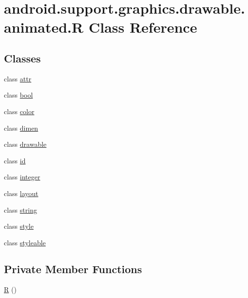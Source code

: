 \hypertarget{classandroid_1_1support_1_1graphics_1_1drawable_1_1animated_1_1_r}{}\section{android.\+support.\+graphics.\+drawable.\+animated.\+R Class Reference}
\label{classandroid_1_1support_1_1graphics_1_1drawable_1_1animated_1_1_r}
\subsection*{Classes}
\begin{DoxyCompactItemize}
\item 
class \mbox{\hyperlink{classandroid_1_1support_1_1graphics_1_1drawable_1_1animated_1_1_r_1_1attr}{attr}}
\item 
class \mbox{\hyperlink{classandroid_1_1support_1_1graphics_1_1drawable_1_1animated_1_1_r_1_1bool}{bool}}
\item 
class \mbox{\hyperlink{classandroid_1_1support_1_1graphics_1_1drawable_1_1animated_1_1_r_1_1color}{color}}
\item 
class \mbox{\hyperlink{classandroid_1_1support_1_1graphics_1_1drawable_1_1animated_1_1_r_1_1dimen}{dimen}}
\item 
class \mbox{\hyperlink{classandroid_1_1support_1_1graphics_1_1drawable_1_1animated_1_1_r_1_1drawable}{drawable}}
\item 
class \mbox{\hyperlink{classandroid_1_1support_1_1graphics_1_1drawable_1_1animated_1_1_r_1_1id}{id}}
\item 
class \mbox{\hyperlink{classandroid_1_1support_1_1graphics_1_1drawable_1_1animated_1_1_r_1_1integer}{integer}}
\item 
class \mbox{\hyperlink{classandroid_1_1support_1_1graphics_1_1drawable_1_1animated_1_1_r_1_1layout}{layout}}
\item 
class \mbox{\hyperlink{classandroid_1_1support_1_1graphics_1_1drawable_1_1animated_1_1_r_1_1string}{string}}
\item 
class \mbox{\hyperlink{classandroid_1_1support_1_1graphics_1_1drawable_1_1animated_1_1_r_1_1style}{style}}
\item 
class \mbox{\hyperlink{classandroid_1_1support_1_1graphics_1_1drawable_1_1animated_1_1_r_1_1styleable}{styleable}}
\end{DoxyCompactItemize}
\subsection*{Private Member Functions}
\begin{DoxyCompactItemize}
\item 
\mbox{\hyperlink{classandroid_1_1support_1_1graphics_1_1drawable_1_1animated_1_1_r_a097d34d9cd60fadc6a4ed075ffdd2f7b}{R}} ()
\end{DoxyCompactItemize}


